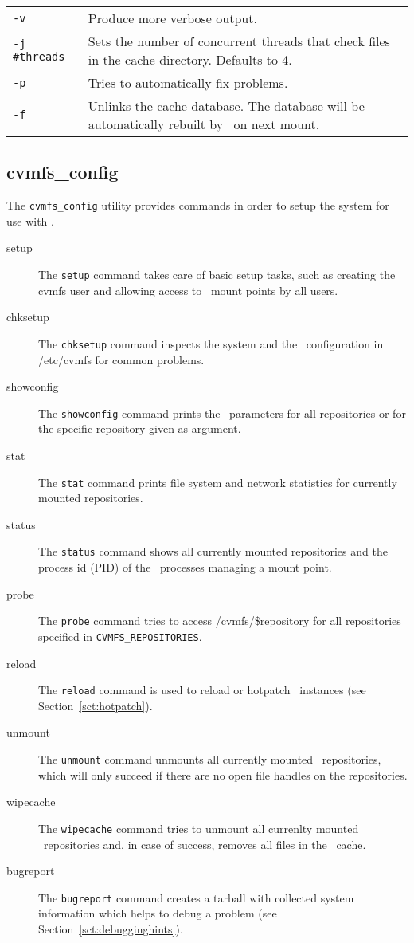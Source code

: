 \begin{tabularx}{\linewidth}{lX}
	\texttt{-v}				& Produce more verbose output.\\
	\texttt{-j \#threads}	& Sets the number of concurrent threads that check files in the cache directory. Defaults to 4. \\
	\texttt{-p} 			& Tries to automatically fix problems. \\
	\texttt{-f} 			& Unlinks the cache database.  The database will be automatically rebuilt by \cvmfs\ on next mount.\\
\end{tabularx}

\subsection{cvmfs\_config}
The \texttt{cvmfs\_config} utility provides commands in order to setup the system for use with \cvmfs.
\begin{description}
	\item[setup] The \texttt{setup} command takes care of basic setup tasks, such as creating the cvmfs user and allowing access to \cvmfs\ mount points by all users.
	\item[chksetup] The \texttt{chksetup} command inspects the system and the \cvmfs\ configuration in /etc/cvmfs for common problems.
	\item [showconfig] The \texttt{showconfig} command prints the \cvmfs\ parameters for all repositories or for the specific repository given as argument.
	\item [stat] The \texttt{stat} command prints file system and network statistics for currently mounted repositories.
	\item [status] The \texttt{status} command shows all currently mounted repositories and the process id (PID) of the \cvmfs\ processes managing a mount point.
	\item [probe] The \texttt{probe} command tries to access /cvmfs/\$repository for all repositories specified in \texttt{CVMFS\_REPOSITORIES}.
	\item [reload] The \texttt{reload} command is used to reload or hotpatch \cvmfs\ instances (see Section~\ref{sct:hotpatch}).
	\item [unmount] The \texttt{unmount} command unmounts all currently mounted \cvmfs\ repositories, which will only succeed if there are no open file handles on the repositories.
	\item [wipecache] The \texttt{wipecache} command tries to unmount all currenlty mounted \cvmfs\ repositories and, in case of success, removes all files in the \cvmfs\ cache.
	\item [bugreport] The \texttt{bugreport} command creates a tarball with collected system information which helps to debug a problem (see Section~\ref{sct:debugginghints}). 
\end{description}

